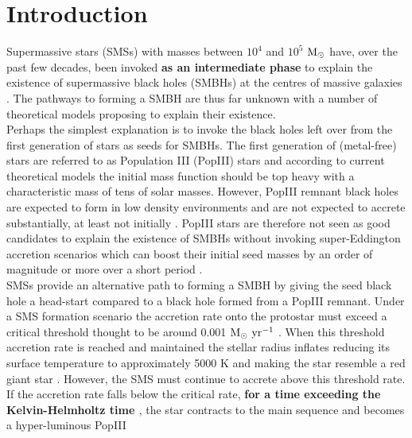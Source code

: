 \documentclass[twocolumn,iop,revtex4]{openjournal}
\newcommand{\msolar} {$\rm{M_{\odot}}~$}
\newcommand{\msolaryr} {$\rm{M_{\odot}~yr^{-1}}~$}
\begin{document}
\section{Introduction} \label{Sec:Introduction}
Supermassive stars (SMSs) with masses between $10^4$ and $10^5$ \msolar have, over the past few decades, been invoked \citep{Rees_1978, Begelman_1978, Begelman_2006,
  Begelman_2008, Latif_2016a, Woods_2018} \textbf{as an intermediate phase} to explain the existence of supermassive black holes (SMBHs) at the centres of massive galaxies \citep{Fan_06, Kormendy_2013}.
The pathways to forming a SMBH are thus far unknown with a number of theoretical models proposing to explain their existence. \\
\indent Perhaps the
simplest explanation is to invoke the black holes left over from the first 
generation of stars as seeds for SMBHs. The first generation of (metal-free) 
stars are referred to as Population III (PopIII) stars and according to 
current theoretical models \citep[e.g.][]{Turk_2009, Clark_2008, Hirano_2014, Stacy_2016} the initial mass function should be
top heavy with a characteristic mass of tens of solar masses. However, PopIII remnant black holes are expected to form in low
density environments \citep{Whalen_2004, OShea_2005b, Milosavljevic_2009} and are not expected to accrete substantially, at least not 
initially \citep{Alvarez_2009, Smith_2018}. PopIII stars are therefore not seen as good candidates to explain the existence
of SMBHs without invoking super-Eddington accretion scenarios which can boost their initial 
seed masses by an order of magnitude or more over a short period
\citep{Lupi_2014, Pacucci_2015a, Sakurai_2016a,Inayoshi_2016, Pacucci_2017, Inayoshi_2018}.\\
\indent SMSs provide an alternative path to forming a SMBH by giving the seed black hole a
head-start compared to a black hole formed from a PopIII remnant. Under a SMS formation scenario
the accretion rate onto the protostar must exceed a critical threshold thought to be around
0.001 \msolaryr \citep{Haemmerle_2017}. When
this threshold accretion rate is reached and maintained the stellar radius inflates reducing
its surface temperature to approximately 5000 K
and making the star resemble a red giant star
\citep{Omukai_2003, Hosokawa_2012, Hosokawa_2013, Woods_2017}. However, the SMS must continue to
accrete above this threshold rate. If the accretion rate falls below the critical
rate, \textbf{for a time exceeding the Kelvin-Helmholtz time \citep{Sakurai_2016}}, the star contracts to the main sequence and becomes a hyper-luminous PopIII
\end{document}
